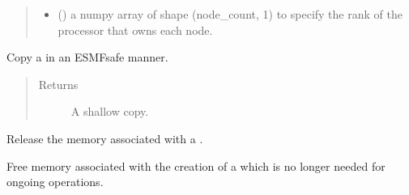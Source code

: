 \documentclass[letterpaper,10pt,english]{sphinxmanual}
\begin{document}
\begin{fulllineitems}
\begin{fulllineitems}
\begin{quote}
\begin{description}
\begin{itemize}
\item {} 
 () \textendash{} a numpy array of shape (node\_count, 1) to
specify the rank of the processor that owns each node.

\end{itemize}

\end{description}\end{quote}

\end{fulllineitems}


\begin{fulllineitems}
\label{\detokenize{mesh:ESMF.api.mesh.Mesh.copy}}
Copy a {\hyperref[\detokenize{mesh:ESMF.api.mesh.Mesh}]{}} in an ESMF\sphinxhyphen{}safe manner.
\begin{quote}\begin{description}
\item[{Returns}] \leavevmode
A {\hyperref[\detokenize{mesh:ESMF.api.mesh.Mesh}]{}} shallow copy.

\end{description}\end{quote}

\end{fulllineitems}


\begin{fulllineitems}
\label{\detokenize{mesh:ESMF.api.mesh.Mesh.destroy}}
Release the memory associated with a {\hyperref[\detokenize{mesh:ESMF.api.mesh.Mesh}]{}}.

\end{fulllineitems}


\begin{fulllineitems}
\label{\detokenize{mesh:ESMF.api.mesh.Mesh.free_memory}}
Free memory associated with the creation of a
{\hyperref[\detokenize{mesh:ESMF.api.mesh.Mesh}]{}} which is no longer needed for ongoing
operations.


\end{fulllineitems}
\end{fulllineitems}
\end{document}
